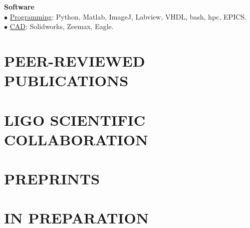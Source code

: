 \documentclass[margin]{res} %
\begin{document}
\begin{resume}
{\bf Software}\\ 
$\bullet$ \underline{Programming}: Python, Matlab, ImageJ, Labview, VHDL, bash, hpc, EPICS.\\
$\bullet$ \underline{CAD}: Solidworks, Zeemax, Eagle.

\end{resume}






\section{PEER-REVIEWED PUBLICATIONS}

\nocite{*}

\printbibliography[heading=none, keyword={peer}]

\section{LIGO SCIENTIFIC COLLABORATION}

\nocite{*}

\printbibliography[heading=none, keyword={lsc}]

\section{PREPRINTS}

\nocite{*}

\printbibliography[heading=none, keyword={npeer}]

\section{IN PREPARATION}

\nocite{*}

\printbibliography[heading=none, keyword={inprep}]
\end{document}
